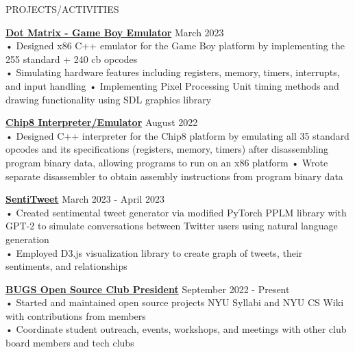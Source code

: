 \documentclass{resume} %
\begin{document}

\begin{rSection}{PROJECTS/ACTIVITIES}


\textbf{\href{https://github.com/aminoa/dot-matrix}{Dot Matrix - Game Boy Emulator}} \hfill March 2023 \\
• Designed x86 C++ emulator for the Game Boy platform by implementing the 255 standard + 240 cb opcodes \\
• Simulating hardware features including registers, memory, timers, interrupts, and input handling \newline
• Implementing Pixel Processing Unit timing methods and drawing functionality using SDL graphics library

\textbf{\href{https://github.com/aminoa/chip8}{Chip8 Interpreter/Emulator}} \hfill August 2022 \\
• Designed C++ interpreter for the Chip8 platform by emulating all 35 standard opcodes and its specifications (registers, memory, timers) after disassembling program binary data, allowing programs to run on an x86 platform \newline
• Wrote separate disassembler to obtain assembly instructions from program binary data



\textbf {\href{https://github.com/aminoa/sentitweet/}{SentiTweet}} \hfill March 2023 - April 2023 \\
• Created sentimental tweet generator via modified PyTorch PPLM library with GPT-2 to simulate conversations between Twitter users using natural language generation\\
• Employed D3.js visualization library to create graph of tweets, their sentiments, and relationships 

\textbf{\href{https://bugs-nyu.github.io/}{BUGS Open Source Club President}} \hfill September 2022 - Present \\
• Started and maintained open source projects NYU Syllabi and NYU CS Wiki with contributions from members\\
• Coordinate student outreach, events, workshops, and meetings with other club board members and tech clubs \\

\end{rSection}
\end{document}

